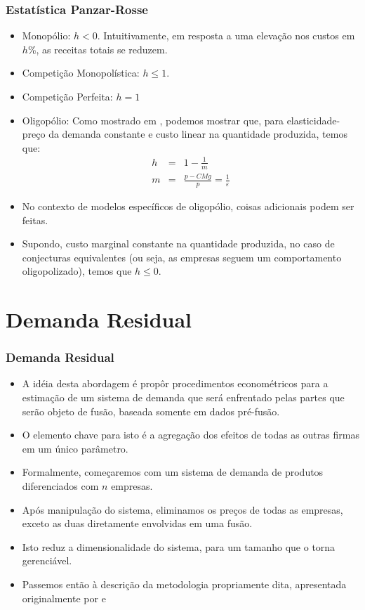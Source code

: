 \documentclass{beamer}
\begin{document}
\begin{frame}[fragile]\frametitle{Estatística Panzar-Rosse}
\footnotesize
\begin{itemize}
	\item Monopólio: $h<0$. Intuitivamente, em resposta a uma elevação nos custos em $h$\%, as receitas totais se reduzem.
	\item Competição Monopolística: $h\leq 1$.
	\item Competição Perfeita: $h=1$
	\item Oligopólio: Como mostrado em \citet{Shaffer1982}, podemos mostrar que, para elasticidade-preço da demanda constante e custo linear na quantidade produzida, temos que:
	\begin{eqnarray*}
	h & = & 1-\frac{1}{m}\\
	m & = & \frac{p-CMg}{p}=\frac{1}{\varepsilon}
	\end{eqnarray*}

	\item No contexto de modelos específicos de oligopólio, coisas adicionais podem ser feitas. 
	\item Supondo, custo marginal constante na quantidade produzida, no caso de conjecturas equivalentes (ou seja, as empresas seguem um comportamento oligopolizado), temos que $h\leq0$. 
\end{itemize}
    


\end{frame}

\section{Demanda Residual}
\begin{frame}\frametitle{Demanda Residual}
\small
\begin{itemize}
\item A idéia desta abordagem é propôr procedimentos econométricos para
a estimação de um sistema de demanda que será enfrentado pelas partes
que serão objeto de fusão, baseada somente em dados pré-fusão. 
\item O elemento chave para isto é a agregação dos efeitos de todas as outras
firmas em um único parâmetro. 
\item Formalmente, começaremos com um sistema de demanda de produtos diferenciados
com $n$ empresas. 
\item Após manipulação do sistema, eliminamos os preços de todas as empresas,
exceto as duas diretamente envolvidas em uma fusão. 
\item Isto reduz a dimensionalidade do sistema, para um tamanho que o torna
gerenciável. 
\item Passemos então à descrição da metodologia propriamente dita, apresentada originalmente por \citet{Baker1985a} e \citet{Baker1988a}
\end{itemize}
\end{frame}
\end{document}
